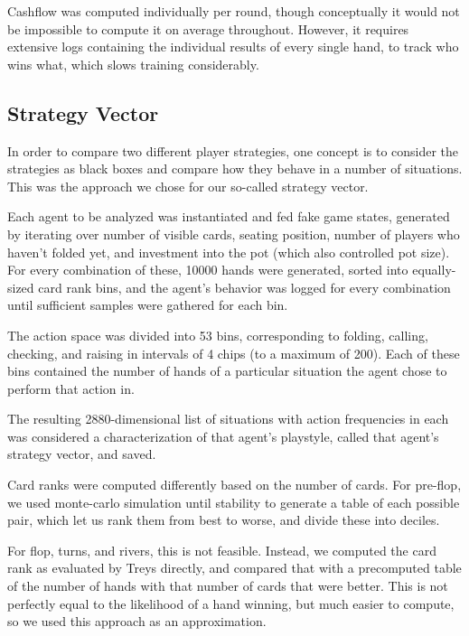 
Cashflow was computed individually per round, though conceptually it would not be impossible to compute it on average throughout. However, it requires extensive logs containing the individual results of every single hand, to track who wins what, which slows training considerably.

\subsection{Strategy Vector}
\label{StrategyVectorComputation}
In order to compare two different player strategies, one concept is to consider the strategies as black boxes and compare how they behave in a number of situations. This was the approach we chose for our so-called strategy vector.

Each agent to be analyzed was instantiated and fed fake game states, generated by iterating over number of visible cards, seating position, number of players who haven't folded yet, and investment into the pot (which also controlled pot size). For every combination of these, 10000 hands were generated, sorted into equally-sized card rank bins, and the agent's behavior was logged for every combination until sufficient samples were gathered for each bin.

The action space was divided into 53 bins, corresponding to folding, calling, checking, and raising in intervals of 4 chips (to a maximum of 200). Each of these bins contained the number of hands of a particular situation the agent chose to perform that action in.

The resulting  2880-dimensional list of situations with action frequencies in each was considered a characterization of that agent's playstyle, called that agent's strategy vector, and saved.


Card ranks were computed differently based on the number of cards. For pre-flop, we used monte-carlo simulation until stability to generate a table of each possible pair, which let us rank them from best to worse, and divide these into deciles.

For flop, turns, and rivers, this is not feasible. Instead, we computed the card rank as evaluated by Treys \cite{Treys} directly, and compared that with a precomputed table of the number of hands with that number of cards that were better. This is not perfectly equal to the likelihood of a hand winning, but much easier to compute, so we used this approach as an approximation. 

